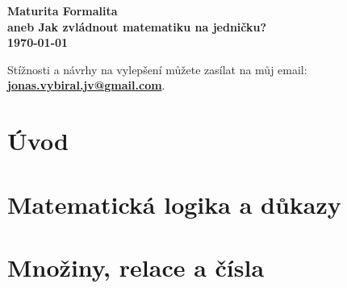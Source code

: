 \documentclass[a4paper, openany]{book}
\newcounter{counter}[section]
\begin{document}
\begin{titlepage}
  \centering
  \vspace*{2cm}
  
  \textbf{\Huge Maturita Formalita}\\[0.5cm]
  
  \textbf{\Large aneb Jak zvládnout matematiku na jedničku?}\\[1.5cm]
  
  \textbf{\Large \today}

  \vfill
  Stížnosti a návrhy na vylepšení můžete zasílat na můj email: \\[0.5cm]
  \textbf{\href{mailto: jonas.vybiral.jv@gmail.com}{jonas.vybiral.jv@gmail.com}}.
\end{titlepage}

\thispagestyle{empty}

\setcounter{tocdepth}{1}
\tableofcontents

\chapter*{Úvod}
  



\chapter{Matematická logika a důkazy}


\chapter{Množiny, relace a čísla}

\end{document}
